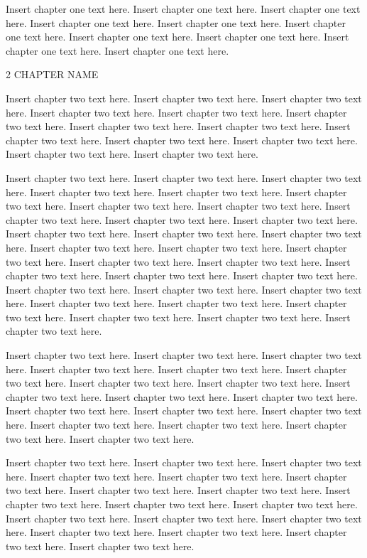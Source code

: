 Insert chapter one text here. Insert chapter one text here. Insert chapter one text here. Insert chapter one text here. Insert chapter one text here. Insert chapter one text here. Insert chapter one text here. Insert chapter one text here. Insert chapter one text here. Insert chapter one text here.

2 CHAPTER NAME

Insert chapter two text here. Insert chapter two text here. Insert chapter two text here. Insert chapter two text here. Insert chapter two text here. Insert chapter two text here. Insert chapter two text here. Insert chapter two text here. Insert chapter two text here. Insert chapter two text here. Insert chapter two text here. Insert chapter two text here. Insert chapter two text here. 

Insert chapter two text here. Insert chapter two text here. Insert chapter two text here. Insert chapter two text here. Insert chapter two text here. Insert chapter two text here. Insert chapter two text here. Insert chapter two text here. Insert chapter two text here. Insert chapter two text here. Insert chapter two text here. Insert chapter two text here. Insert chapter two text here. Insert chapter two text here. Insert chapter two text here. Insert chapter two text here. Insert chapter two text here. Insert chapter two text here. Insert chapter two text here. Insert chapter two text here. Insert chapter two text here. Insert chapter two text here. Insert chapter two text here. Insert chapter two text here. Insert chapter two text here. Insert chapter two text here. Insert chapter two text here. Insert chapter two text here. Insert chapter two text here. Insert chapter two text here. Insert chapter two text here. 

Insert chapter two text here. Insert chapter two text here. Insert chapter two text here. Insert chapter two text here. Insert chapter two text here. Insert chapter two text here. Insert chapter two text here. Insert chapter two text here. Insert chapter two text here. Insert chapter two text here. Insert chapter two text here. Insert chapter two text here. Insert chapter two text here. Insert chapter two text here. Insert chapter two text here. Insert chapter two text here. Insert chapter two text here. Insert chapter two text here. 

Insert chapter two text here. Insert chapter two text here. Insert chapter two text here. Insert chapter two text here. Insert chapter two text here. Insert chapter two text here. Insert chapter two text here. Insert chapter two text here. Insert chapter two text here. Insert chapter two text here. Insert chapter two text here. Insert chapter two text here. Insert chapter two text here. Insert chapter two text here. Insert chapter two text here. Insert chapter two text here. Insert chapter two text here. Insert chapter two text here.

